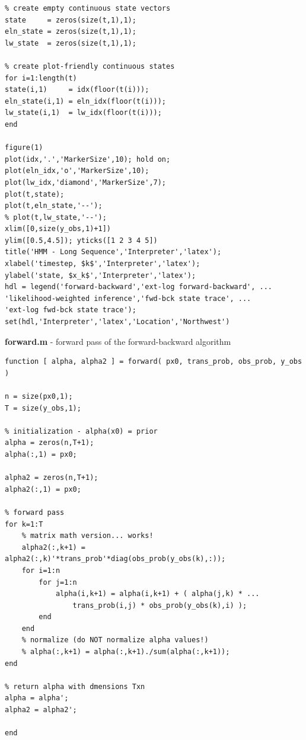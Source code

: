 \documentclass[]{article}
\begin{document}
\begin{lstlisting}
% create empty continuous state vectors
state     = zeros(size(t,1),1);
eln_state = zeros(size(t,1),1);
lw_state  = zeros(size(t,1),1);

% create plot-friendly continuous states
for i=1:length(t)
state(i,1)     = idx(floor(t(i)));
eln_state(i,1) = eln_idx(floor(t(i)));
lw_state(i,1)  = lw_idx(floor(t(i)));
end

figure(1)
plot(idx,'.','MarkerSize',10); hold on;
plot(eln_idx,'o','MarkerSize',10);
plot(lw_idx,'diamond','MarkerSize',7);
plot(t,state);
plot(t,eln_state,'--');
% plot(t,lw_state,'--');
xlim([0,size(y_obs,1)+1])
ylim([0.5,4.5]); yticks([1 2 3 4 5])
title('HMM - Long Sequence','Interpreter','latex');
xlabel('timestep, $k$','Interpreter','latex');
ylabel('state, $x_k$','Interpreter','latex');
hdl = legend('forward-backward','ext-log forward-backward', ...
'likelihood-weighted inference','fwd-bck state trace', ...
'ext-log fwd-bck state trace');
set(hdl,'Interpreter','latex','Location','Northwest')
\end{lstlisting}

\textbf{forward.m} - forward pass of the forward-backward algorithm
\begin{lstlisting}
function [ alpha, alpha2 ] = forward( px0, trans_prob, obs_prob, y_obs )

n = size(px0,1);
T = size(y_obs,1);

% initialization - alpha(x0) = prior
alpha = zeros(n,T+1);
alpha(:,1) = px0;

alpha2 = zeros(n,T+1);
alpha2(:,1) = px0;

% forward pass
for k=1:T
	% matrix math version... works!
	alpha2(:,k+1) = alpha2(:,k)'*trans_prob'*diag(obs_prob(y_obs(k),:));
	for i=1:n
		for j=1:n
			alpha(i,k+1) = alpha(i,k+1) + ( alpha(j,k) * ...
				trans_prob(i,j) * obs_prob(y_obs(k),i) );
		end
	end
	% normalize (do NOT normalize alpha values!)
	% alpha(:,k+1) = alpha(:,k+1)./sum(alpha(:,k+1));
end

% return alpha with dmensions Txn
alpha = alpha';
alpha2 = alpha2';

end
\end{lstlisting}
\end{document}
